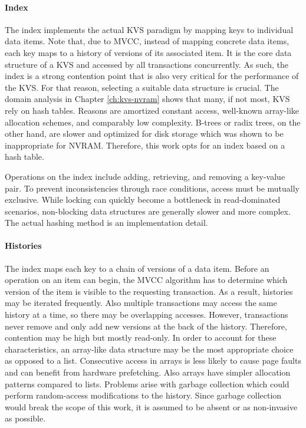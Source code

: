 \paragraph{Index}

The index implements the actual KVS paradigm by mapping keys to individual data
items. Note that, due to MVCC, instead of mapping concrete data items, each key
maps to a history of versions of its associated item. It is the core data
structure of a KVS and accessed by all transactions concurrently. As such, the
index is a strong contention point that is also very critical for the
performance of the KVS. For that reason, selecting a suitable data structure is
crucial. The domain analysis in Chapter \ref{ch:kvs-nvram} shows that many, if
not most, KVS rely on hash tables. Reasons are amortized constant access,
well-known array-like allocation schemes, and comparably low complexity. B-trees
or radix trees, on the other hand, are slower and optimized for disk storage
which was shown to be inappropriate for NVRAM. Therefore, this work opts for an
index based on a hash table.

Operations on the index include adding, retrieving, and removing a key-value
pair. To prevent inconsistencies through race conditions, access must be
mutually exclusive. While locking can quickly become a bottleneck in
read-dominated scenarios, non-blocking data structures are generally slower and
more complex. The actual hashing method is an implementation detail.

\paragraph{Histories}

The index maps each key to a chain of versions of a data item. Before an
operation on an item can begin, the MVCC algorithm has to determine which
version of the item is visible to the requesting transaction. As a result,
histories may be iterated frequently. Also multiple transactions may access the
same history at a time, so there may be overlapping accesses. However,
transactions never remove and only add new versions at the back of the history.
Therefore, contention may be high but mostly read-only. In order to account for
these characteristics, an array-like data structure may be the most appropriate
choice as opposed to a list. Consecutive access in arrays is less likely to
cause page faults and can benefit from hardware prefetching. Also arrays have
simpler allocation patterns compared to lists. Problems arise with garbage
collection which could perform random-access modifications to the history. Since
garbage collection would break the scope of this work, it is assumed to be
absent or as non-invasive as possible.

